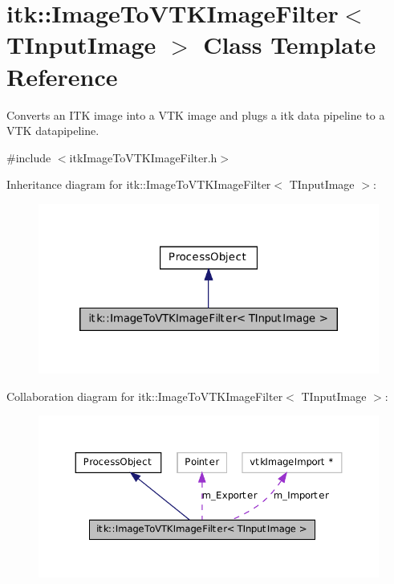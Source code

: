 \hypertarget{classitk_1_1_image_to_v_t_k_image_filter}{
\section{itk::ImageToVTKImageFilter$<$ TInputImage $>$ Class Template Reference}
\label{classitk_1_1_image_to_v_t_k_image_filter}
}


Converts an ITK image into a VTK image and plugs a itk data pipeline to a VTK datapipeline.  




{\ttfamily \#include $<$itkImageToVTKImageFilter.h$>$}



Inheritance diagram for itk::ImageToVTKImageFilter$<$ TInputImage $>$:\nopagebreak
\begin{figure}[H]
\begin{center}
\leavevmode
\includegraphics[width=322pt]{classitk_1_1_image_to_v_t_k_image_filter__inherit__graph}
\end{center}
\end{figure}


Collaboration diagram for itk::ImageToVTKImageFilter$<$ TInputImage $>$:\nopagebreak
\begin{figure}[H]
\begin{center}
\leavevmode
\includegraphics[width=366pt]{classitk_1_1_image_to_v_t_k_image_filter__coll__graph}
\end{center}
\end{figure}
